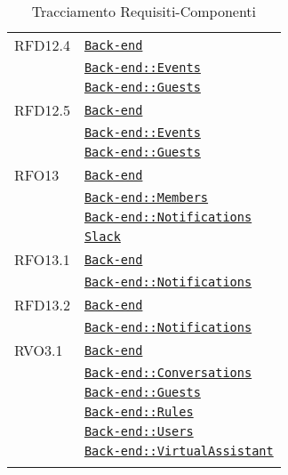 \begin{longtable}{|>{\centering}m{3cm}|m{10cm}<{\centering}|}
RFD12.4 & \hyperref[Back-end]{\texttt{Back-end}}\\
& \hyperref[Back-end::Events]{\texttt{Back-end::Events}}\\
& \hyperref[Back-end::Guests]{\texttt{Back-end::Guests}}\\ \hline

RFD12.5 & \hyperref[Back-end]{\texttt{Back-end}}\\
& \hyperref[Back-end::Events]{\texttt{Back-end::Events}}\\
& \hyperref[Back-end::Guests]{\texttt{Back-end::Guests}}\\ \hline

RFO13 & \hyperref[Back-end]{\texttt{Back-end}}\\
& \hyperref[Back-end::Members]{\texttt{Back-end::Members}}\\
& \hyperref[Back-end::Notifications]{\texttt{Back-end::Notifications}}\\
& \hyperref[Slack]{\texttt{Slack}}\\ \hline

RFO13.1 & \hyperref[Back-end]{\texttt{Back-end}}\\
& \hyperref[Back-end::Notifications]{\texttt{Back-end::Notifications}}\\ \hline

RFD13.2 & \hyperref[Back-end]{\texttt{Back-end}}\\
& \hyperref[Back-end::Notifications]{\texttt{Back-end::Notifications}}\\ \hline

RVO3.1 & \hyperref[Back-end]{\texttt{Back-end}}\\
& \hyperref[Back-end::Conversations]{\texttt{Back-end::Conversations}}\\
& \hyperref[Back-end::Guests]{\texttt{Back-end::Guests}}\\
& \hyperref[Back-end::Rules]{\texttt{Back-end::Rules}}\\
& \hyperref[Back-end::Users]{\texttt{Back-end::Users}}\\
& \hyperref[Back-end::VirtualAssistant]{\texttt{Back-end::VirtualAssistant}}\\ \hline

\caption[Tracciamento Requisiti-Componenti]{Tracciamento Requisiti-Componenti}
\label{tabella:requi-pack}
\end{longtable}
\clearpage
